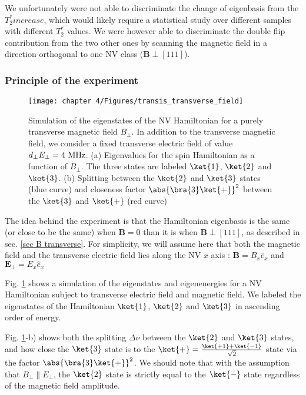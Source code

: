 \documentclass[a4paper, 11pt]{report}
\begin{document}
We unfortunately were not able to discriminate the change of eigenbasis from the $T_2^* increase$, which would likely require a statistical study over different samples with different $T_2^*$ values. We were however able to discriminate the double flip contribution from the two other ones by scanning the magnetic field in a direction orthogonal to one NV class ($\mathbf{B} \perp [111]$).

\subsubsection{Principle of the experiment}
\begin{figure}[h]
\centering
\texttt{[image: chapter 4/Figures/transis\_transverse\_field]}
\caption{Simulation of the eigenstates of the NV Hamiltonian for  a purely transverse magnetic field $B_\perp$. In addition to the transverse magnetic field, we consider a fixed transverse electric field of value $d_\perp E_\perp=4\ \rm MHz$. (a) Eigenvalues for the spin Hamiltonian as a function of $B_\perp$. The three states are labeled $\ket{1}$, $\ket{2}$ and $\ket{3}$. (b) Splitting between the $\ket{2}$ and $\ket{3}$ states (blue curve) and closeness factor $\abs{\bra{3}\ket{+}}^2$ between the $\ket{3}$ and $\ket{+}$ (red curve)}
\label{eigenstates transverse field}
\end{figure}

The idea behind the experiment is that the Hamiltonian eigenbasis is the same (or close to be the same) when $\mathbf{B}=0$ than it is when $\mathbf{B} \perp [111]$, as described in sec. \ref{sec B transverse}. For simplicity, we will assume here that both the magnetic field and the transverse electric field lies along the NV $x$ axis : $\mathbf{B}=B_x \hat{e}_x$ and $\mathbf{E}_\perp =E_x \hat{e}_x$

Fig. \ref{eigenstates transverse field} shows a simulation of the eigenstates and eigenenergies for a NV Hamiltonian subject to transverse electric field and magnetic field. We labeled the eigenstates of the Hamiltonian $\ket{1}$, $\ket{2}$ and $\ket{3}$ in ascending order of energy.

Fig. \ref{eigenstates transverse field}-b) shows both the splitting $\Delta \nu$ between the $\ket{2}$ and $\ket{3}$ states, and how close the $\ket{3}$ state is to the $\ket{+}=\frac{\ket{+1}+\ket{-1}}{\sqrt{2}}$ state via the factor $\abs{\bra{3}\ket{+}}^2$. We should note that with the assumption that $B_\perp \parallel E_\perp$, the $\ket{2}$ state is strictly equal to the $\ket{-}$ state regardless of the magnetic field amplitude.
\end{document}
